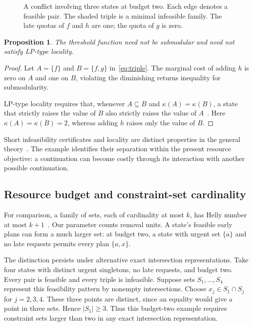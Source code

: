 \documentclass[11pt,a4paper]{amsart}
\newtheorem{proposition}[theorem]{Proposition}
\theoremstyle{definition}
\theoremstyle{remark}
\newcommand{\card}[1]{\lvert #1\rvert}
\begin{document}
\begin{figure}[htbp]
\centering

\caption{A conflict involving three states at budget two. Each edge denotes
a feasible pair. The shaded triple is a minimal infeasible family. The late
quotas of $f$ and $h$ are one; the quota of $g$ is zero.}
\label{fig:conflict}
\end{figure}

\begin{proposition}\label{prop:locality}
The threshold function need not be submodular and need not satisfy
LP-type locality.
\end{proposition}
\begin{proof}
Let $A=\{f\}$ and $B=\{f,g\}$ in~\eqref{eq:triple}. The marginal cost
of adding $h$ is zero on $A$ and one on $B$, violating the diminishing
returns inequality for submodularity.

LP-type locality requires that, whenever $A\subseteq B$ and
$\kappa(A)=\kappa(B)$, a state that strictly raises the value of $B$
also strictly raises the value of $A$~\cite{amenta,amentathesis}.
Here $\kappa(A)=\kappa(B)=2$, whereas adding $h$ raises only the value
of $B$.
\end{proof}

Short infeasibility certificates and locality are distinct properties
in the general theory~\cite{amentathesis}. The example identifies their
separation within the present resource objective: a continuation can
become costly through its interaction with another possible continuation.

\subsection{Resource budget and constraint-set cardinality}
For comparison, a family of sets, each of cardinality at most $k$, has
Helly number at most $k+1$~\cite[Theorem~7]{cardinal}. Our parameter
counts removal units. A state's feasible early plans can form a much
larger set: at budget two, a state with urgent set $\{a\}$ and no late
requests permits every plan $\{a,x\}$.

The distinction persists under alternative exact intersection
representations. Take four states with distinct urgent singletons,
no late requests, and budget two. Every pair is feasible and every
triple is infeasible. Suppose sets $S_1,\ldots,S_4$ represent this
feasibility pattern by nonempty intersections. Choose
$x_j\in S_1\cap S_j$ for $j=2,3,4$. These three points are distinct,
since an equality would give a point in three sets. Hence
$\card{S_1}\ge3$. Thus this budget-two example requires constraint
sets larger than two in any exact intersection representation.
\end{document}
